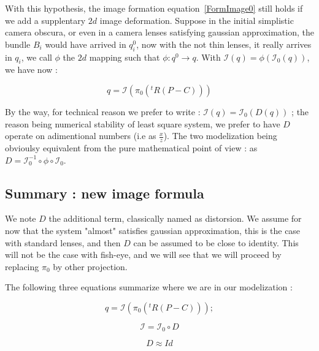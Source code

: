 With this hypothesis, the image formation equation~\ref{FormImage0} still holds if
we add a supplentary $2d$ image deformation. Suppose in the initial simplistic camera
obscura, or even in a camera lenses satisfying gaussian approximation, 
the bundle $B_i$ would have arrived in $q^0_i$, now with the not thin lenses,
it really arrives in $q_i$, we call $\phi$ the $2d$ mapping such that $\phi : q^0 \rightarrow q$.
With $ \mathcal{I}(q) = \phi (\mathcal{I}_0(q))  $, we have now :


\begin{equation}
	q  =   \mathcal{I} (\pi_0 (^t R (P - C)))
\end{equation}

By the way, for technical reason we prefer to write : $ \mathcal{I}(q) = \mathcal{I}_0(D(q)) $ ; 
the reason being numerical stability of least square system, we prefer to have $D$ operate on adimentional numbers
(i.e as $\frac{x}{z}$).  The two modelization being obvioulsy equivalent from the pure mathematical point of view :
as $D= \mathcal{I}_0^{-1} \circ \phi \circ  \mathcal{I}_0$.


\subsection{Summary : new image formula}

We note $D$ the additional term, classically named as distorsion. We assume for now that the 
system "almost" satisfies gaussian approximation,  this is the case with standard lenses, 
and then $D$ can be assumed to be close to identity.
This will not be the case with fish-eye, and we will see that we will proceed by replacing $\pi_0$ by other
projection.

The following three equations summarize where we are in our modelization :



\begin{equation}
	q  =   \mathcal{I} (\pi_0 (^t R (P - C))) ; \label{FormImage1}
\end{equation}

\begin{equation}
	\mathcal{I} = \mathcal{I}_0  \circ D \label{FormImage2}
\end{equation}

\begin{equation}
	  D \approx Id \label{FormImage3}
\end{equation}

